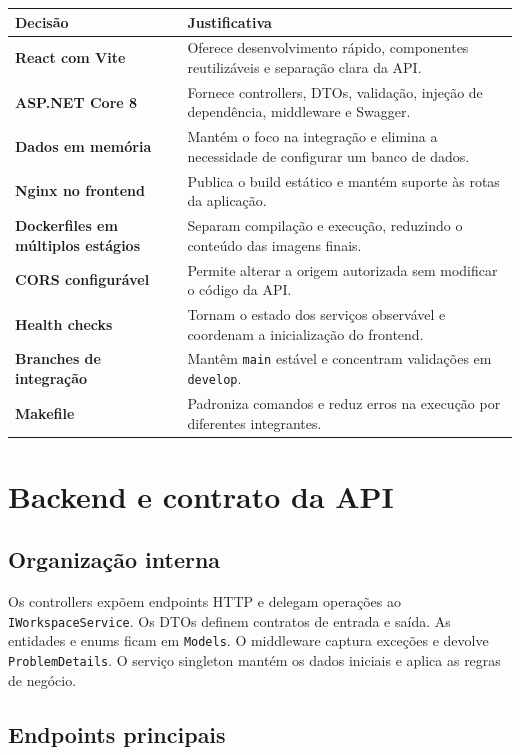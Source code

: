 \documentclass[12pt,a4paper,openany]{report}
\begin{document}
\begin{longtable}{>{\bfseries}p{} p{}}
\toprule
Decisão & Justificativa \\
\midrule
\endhead
React com Vite & Oferece desenvolvimento rápido, componentes reutilizáveis e separação clara da API. \\
ASP.NET Core 8 & Fornece controllers, DTOs, validação, injeção de dependência, middleware e Swagger. \\
Dados em memória & Mantém o foco na integração e elimina a necessidade de configurar um banco de dados. \\
Nginx no frontend & Publica o build estático e mantém suporte às rotas da aplicação. \\
Dockerfiles em múltiplos estágios & Separam compilação e execução, reduzindo o conteúdo das imagens finais. \\
CORS configurável & Permite alterar a origem autorizada sem modificar o código da API. \\
Health checks & Tornam o estado dos serviços observável e coordenam a inicialização do frontend. \\
Branches de integração & Mantêm \texttt{main} estável e concentram validações em \texttt{develop}. \\
Makefile & Padroniza comandos e reduz erros na execução por diferentes integrantes. \\
\bottomrule
\end{longtable}

\chapter{Backend e contrato da API}

\section{Organização interna}

Os controllers expõem endpoints HTTP e delegam operações ao \texttt{IWorkspaceService}. Os DTOs definem contratos de entrada e saída. As entidades e enums ficam em \texttt{Models}. O middleware captura exceções e devolve \texttt{ProblemDetails}. O serviço singleton mantém os dados iniciais e aplica as regras de negócio.

\section{Endpoints principais}
\end{document}
